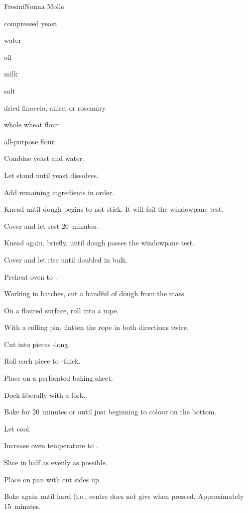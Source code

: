 \begin{recipe}{Fresini}{Nonna Mollo}{}

\begin{ingredients}
\item {} compressed yeast
\item {} water
\item {} oil
\item {} milk
\item {} salt
\item \tp{\half} dried finoccio, anise, or rosemary
\item {} whole wheat flour
\item {} all-purpose flour
\end{ingredients}

\begin{directions}
\item Combine yeast and water.
\item Let stand until yeast dissolves.
\item Add remaining ingredients in order.
\item Knead until dough begins to not stick. It will fail the windowpane test.
\item Cover and let rest 20~minutes.
\item Knead again, briefly, until dough passes the windowpane test.
\item Cover and let rise until doubled in bulk.
\item Preheat oven to .
\item Working in batches, cut a handful of dough from the mass.
\item On a floured surface, roll into a rope.
\item With a rolling pin, flatten the rope in both directions twice.
\item Cut into pieces -long.
\item Roll each piece to \inch{\quarter}-thick.
\item Place on a perforated baking sheet.
\item Dock liberally with a fork.
\item Bake for 20~minutes or until just beginning to colour on the bottom.
\item Let cool.
\item Increase oven temperature to .
\item Slice in half as evenly as possible.
\item Place on pan with cut sides up.
\item Bake again until hard (i.e., centre does not give when pressed. Approximately 15~minutes.
\end{directions}

\end{recipe}
